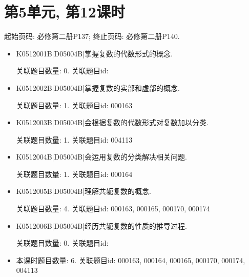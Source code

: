 \section*{第5单元, 第12课时}
起始页码: 必修第二册P137; 终止页码: 必修第二册P140.
\begin{itemize}
\item K0512001B|D05004B|掌握复数的代数形式的概念.

关联题目数量: 0. 关联题目id: 

\item K0512002B|D05004B|掌握复数的实部和虚部的概念.

关联题目数量: 1. 关联题目id: 000163

\item K0512003B|D05004B|会根据复数的代数形式对复数加以分类.

关联题目数量: 1. 关联题目id: 004113

\item K0512004B|D05004B|会运用复数的分类解决相关问题.

关联题目数量: 1. 关联题目id: 000164

\item K0512005B|D05004B|理解共轭复数的概念.

关联题目数量: 4. 关联题目id: 000163, 000165, 000170, 000174

\item K0512006B|D05004B|经历共轭复数的性质的推导过程.

关联题目数量: 0. 关联题目id: 

\item 本课时题目数量: 6. 关联题目id: 000163, 000164, 000165, 000170, 000174, 004113

\end{itemize}

